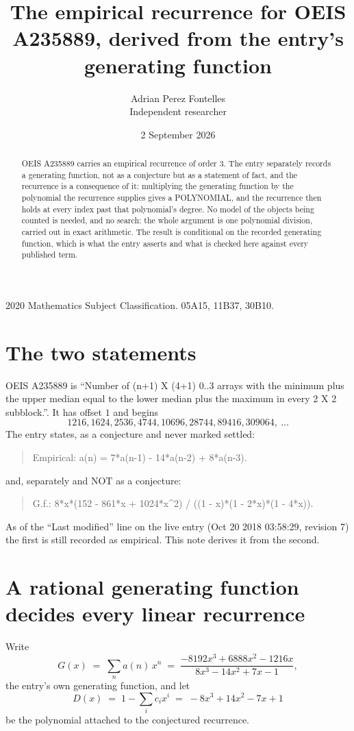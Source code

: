\documentclass[11pt,a4paper]{article}
\title{The empirical recurrence for OEIS A235889, derived from the entry's generating function}
\author{Adrian Perez Fontelles\\ \small Independent researcher}
\date{2 September 2026}
\theoremstyle{plain}
\theoremstyle{definition}
\begin{document}
\maketitle

\begin{abstract}
OEIS A235889 carries an empirical recurrence of order $3$. The entry separately records a
generating function, not as a conjecture but as a statement of fact, and the recurrence is a
consequence of it: multiplying the generating function by the polynomial the recurrence
supplies gives a POLYNOMIAL, and the recurrence then holds at every index past that
polynomial's degree. No model of the objects being counted is needed, and no search: the
whole argument is one polynomial division, carried out in exact arithmetic. The result is
conditional on the recorded generating function, which is what the entry asserts and what is
checked here against every published term.
\end{abstract}

\noindent\small 2020 Mathematics Subject Classification. 05A15, 11B37, 30B10.\normalsize

\section{The two statements}

OEIS A235889 is ``Number of (n+1) X (4+1) 0..3 arrays with the minimum plus the upper median equal to the lower median plus the maximum in every 2 X 2 subblock.''. It has offset $1$ and begins
\[
1216, 1624, 2536, 4744, 10696, 28744, 89416, 309064,\ \dots
\]
The entry states, as a conjecture and never marked settled:
\begin{quote}
Empirical: a(n) = 7*a(n-1) - 14*a(n-2) + 8*a(n-3).
\end{quote}
and, separately and NOT as a conjecture:
\begin{quote}
G.f.: 8*x*(152 - 861*x + 1024*x\^{}2) / ((1 - x)*(1 - 2*x)*(1 - 4*x)).
\end{quote}
As of the ``Last modified'' line on the live entry (Oct 20 2018 03:58:29, revision 7) the first is still
recorded as empirical. This note derives it from the second.

\section{A rational generating function decides every linear recurrence}

Write
\[
G(x)\;=\;\sum_{n}a(n)\,x^{n}\;=\;\frac{- 8192 x^{3} + 6888 x^{2} - 1216 x}{8 x^{3} - 14 x^{2} + 7 x - 1},
\]
the entry's own generating function, and let
\[
D(x)\;=\;1-\sum_i c_i x^{i}\;=\;- 8 x^{3} + 14 x^{2} - 7 x + 1
\]
be the polynomial attached to the conjectured recurrence.
\end{document}
